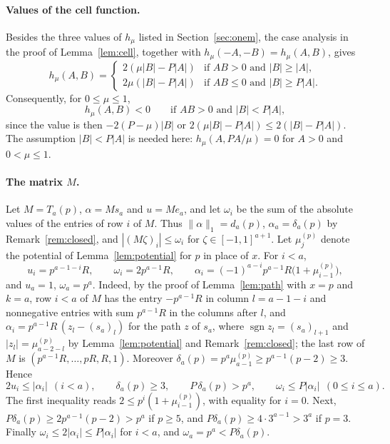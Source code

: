 \documentclass[11pt]{article}
\theoremstyle{remark}
\begin{document}
\paragraph{Values of the cell function.} Besides the three values of $h_\mu$
listed in Section~\ref{sec:onem}, the case analysis in the proof of
Lemma~\ref{lem:cell}, together with $h_\mu(-A,-B)=h_\mu(A,B)$, gives
\begin{equation}\label{eq:hmore}
h_\mu(A,B)=\begin{cases}2(\mu|B|-P|A|)&\text{if $AB>0$ and $|B|\ge|A|$,}\\
2\mu(|B|-P|A|)&\text{if $AB\le0$ and $|B|\ge P|A|$.}\end{cases}
\end{equation}
Consequently, for $0\le\mu\le1$,
\begin{equation}\label{eq:hneg}
h_\mu(A,B)<0\qquad\text{if $AB>0$ and $|B|<P|A|$},
\end{equation}
since the value is then $-2(P-\mu)|B|$ or $2(\mu|B|-P|A|)\le2(|B|-P|A|)$. The
assumption $|B|<P|A|$ is needed here: $h_\mu(A,PA/\mu)=0$ for $A>0$ and
$0<\mu\le1$.

\paragraph{The matrix $M$.} Let $M=T_a(p)$, $\alpha=Ms_a$ and $u=Me_a$, and
let $\omega_i$ be the sum of the absolute values of the entries of row $i$ of
$M$. Thus $\|\alpha\|_1=d_a(p)$, $\alpha_a=\delta_a(p)$ by
Remark~\ref{rem:closed}, and $|(M\zeta)_i|\le\omega_i$ for
$\zeta\in[-1,1]^{a+1}$. Let $\mu^{(p)}_j$ denote the potential of
Lemma~\ref{lem:potential} for $p$ in place of $x$. For $i<a$,
\begin{equation}\label{eq:Mfacts}
u_i=p^{a-1-i}R,\qquad \omega_i=2p^{a-1}R,\qquad
\alpha_i=(-1)^{a-i}p^{a-1}R\bigl(1+\mu^{(p)}_{i-1}\bigr),
\end{equation}
and $u_a=1$, $\omega_a=p^a$. Indeed, by the proof of Lemma~\ref{lem:path}
with $x=p$ and $k=a$, row $i<a$ of $M$ has the entry $-p^{a-1}R$ in column
$l=a-1-i$ and nonnegative entries with sum $p^{a-1}R$ in the columns after
$l$, and $\alpha_i=p^{a-1}R\,(z_l-(s_a)_l)$ for the path $z$ of $s_a$, where
$\operatorname{sgn}z_l=(s_a)_{l+1}$ and $|z_l|=\mu^{(p)}_{a-2-l}$ by
Lemma~\ref{lem:potential} and Remark~\ref{rem:closed}; the last row of $M$ is
$(p^{a-1}R,\dots,pR,R,1)$. Moreover
$\delta_a(p)=p^a\mu^{(p)}_{a-1}\ge p^{a-1}(p-2)\ge3$. Hence
\begin{equation}\label{eq:Afacts}
2u_i\le|\alpha_i|\ \ (i<a),\qquad \delta_a(p)\ge3,\qquad
P\,\delta_a(p)>p^a,\qquad \omega_i\le P|\alpha_i|\ \ (0\le i\le a).
\end{equation}
The first inequality reads $2\le p^i(1+\mu^{(p)}_{i-1})$, with equality for
$i=0$. Next, $P\delta_a(p)\ge2p^{a-1}(p-2)>p^a$ if $p\ge5$, and
$P\delta_a(p)\ge4\cdot3^{a-1}>3^a$ if $p=3$. Finally
$\omega_i\le2|\alpha_i|\le P|\alpha_i|$ for $i<a$, and
$\omega_a=p^a<P\delta_a(p)$.
\end{document}
